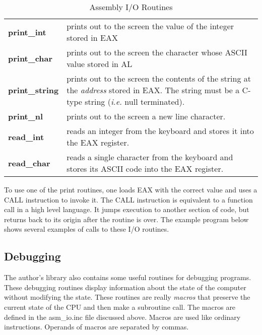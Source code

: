 \begin{table}[t]
\centering
\begin{tabular}{lp{3.5in}}
{\bf print\_int} & prints out to the screen the value of the integer stored 
                  in EAX \\
{\bf print\_char} & prints out to the screen the character whose
                    ASCII value stored in AL \\
{\bf print\_string} & prints out to the screen the contents of the string
                     at the {\em address} stored in EAX. The string must be
                     a C-type string ({\em i.e.} null terminated). \\
{\bf print\_nl} & prints out to the screen a new line character. \\
{\bf read\_int} & reads an integer from the keyboard and stores it into the
                 EAX register. \\
{\bf read\_char} & reads a single character from the keyboard and stores its
                  ASCII code into the EAX register. \\
\end{tabular}
\caption{Assembly I/O Routines \label{tab:asmio} 
  
 
}
\end{table}

To use one of the print routines, one loads EAX with the correct value and
uses a {\code CALL} instruction to invoke it. The {\code CALL} instruction
is equivalent to a function call in a high level language. It jumps execution
to another section of code, but returns back to its origin after the routine
is over. The example program below shows several examples of calls to these
I/O routines.

\subsection{Debugging}

The author's library also contains some useful routines for debugging 
programs. These debugging routines display information about the state of
the computer without modifying the state. These routines are really
\emph{macros} that preserve the current state of the CPU and then make a
subroutine call. The macros are defined in the {\code asm\_io.inc} file
discussed above. Macros are used like ordinary instructions. Operands of
macros are separated by commas.

